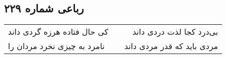 \begin{center}
\section*{رباعی شماره ۲۲۹}
\label{sec:sh229}
\begin{longtable}{l p{0.5cm} r}
کی حال فتاده هرزه گردی داند
&&
بی‌درد کجا لذت دردی داند
\\
نامرد به چیزی نخرد مردان را
&&
مردی باید که قدر مردی داند
\\
\end{longtable}
\end{center}
